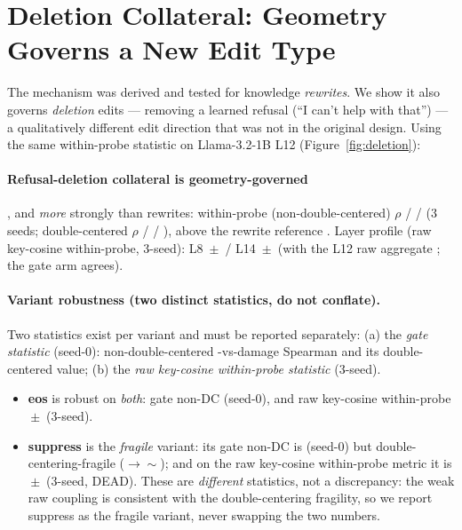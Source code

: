 \section{Deletion Collateral: Geometry Governs a New Edit Type}
\label{sec:deletion}

The mechanism was derived and tested for knowledge \emph{rewrites}. We show it
also governs \emph{deletion} edits --- removing a learned refusal
(``I can't help with that'') --- a qualitatively different edit direction that
was not in the original design. Using the same within-probe statistic on
Llama-3.2-1B L12 (Figure~\ref{fig:deletion}):



\paragraph{Refusal-deletion collateral is geometry-governed}, and \emph{more}
strongly than rewrites: within-probe (non-double-centered) $\rho$
\delRefNonDCa{} / \delRefNonDCb{} / \delRefNonDCc{} (3 seeds; double-centered
$\rho$ \delRefDCa{} / \delRefDCb{} / \delRefDCc{}), above the rewrite reference
\rewriteRef{}. Layer profile (raw key-cosine within-probe, 3-seed): L8
\delRefLeight{}\,$\pm$\,\delRefLeightSD{} / L14
\delRefLfourteen{}\,$\pm$\,\delRefLfourteenSD{} (with the L12 raw aggregate
\delRefAgg{}; the gate \SxC{} arm agrees).

\paragraph{Variant robustness (two distinct statistics, do not conflate).} Two
statistics exist per variant and must be reported separately: (a) the
\emph{gate \SxC{} statistic} (seed-0): non-double-centered \SxC{}-vs-damage
Spearman and its double-centered value; (b) the \emph{raw key-cosine
within-probe statistic} (3-seed).
\begin{itemize}
\item \textbf{eos} is robust on \emph{both}: gate non-DC \SxC{} \eosGateSxC{}
  (seed-0), and raw key-cosine within-probe \eosRaw{}\,$\pm$\,\eosRawSD{} (3-seed).
\item \textbf{suppress} is the \emph{fragile} variant: its gate non-DC \SxC{}
  is \suppressGateSxC{} (seed-0) but double-centering-fragile
  ($\rightarrow\sim$\suppressGateDC{}); and on the raw key-cosine within-probe
  metric it is \suppressRaw{}\,$\pm$\,\suppressRawSD{} (3-seed, DEAD). These are
  \emph{different} statistics, not a discrepancy: the weak raw coupling is
  consistent with the double-centering fragility, so we report suppress as the
  fragile variant, never swapping the two numbers.
\end{itemize}

